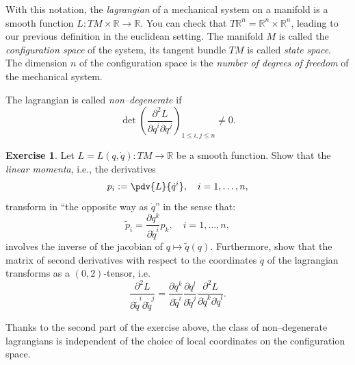 \documentclass[english,fontsize=11pt,paper=b5]{scrbook}
\theoremstyle{definition}
\newtheorem{exercise}{Exercise}[chapter]
\begin{document}
    With this notation, the \emph{lagrangian} of a mechanical system on a manifold is a smooth function $L : TM\times\mathbb{R} \to \mathbb{R}$.
    You can check that $T\mathbb{R}^n = \mathbb{R}^n \times \mathbb{R}^n$, leading to our previous definition in the euclidean setting.
    The manifold $M$ is called the \emph{configuration space} of the system, its tangent bundle $TM$ is called \emph{state space}. The dimension $n$ of the configuration space is the \emph{number of degrees of freedom} of the mechanical system.

    The lagrangian is called \emph{non--degenerate} if
    \begin{equation}
      \det %
      \left(\frac{\partial^2 L}{\partial \dot{q}^i \partial \dot{q}^j}\right)_{1\leq i,j\leq n}
      \neq 0.
    \end{equation}

    \begin{exercise}\label{exe:coordinatesInd}
      Let $L=L(q,\dot q):TM \to \mathbb{R}$ be a smooth function. Show that the \emph{linear momenta}, i.e., the derivatives
      \begin{equation}
        p_i := \pdv{L}{\dot q^i}, \quad i=1,\ldots,n,
      \end{equation}
      transform in ``the opposite way as $\dot q$'' in the sense that:
      \begin{equation}
        \widetilde p_i = \frac{\partial q^k}{\partial {\widetilde q}^i} p_k, \quad i=1,\ldots,n,
      \end{equation}
      involves the inverse of the jacobian of $q\mapsto \widetilde q(q)$.
      Furthermore, show that the matrix of second derivatives with respect to the coordinates $\dot q$ of the lagrangian transforms as a $(0,2)$-tensor, i.e.
      \begin{equation}
        \frac{\partial^2 L}{\partial \dot{\widetilde q}^i \partial \dot{\widetilde q}^j} =
        \frac{\partial q^k}{\partial {\widetilde q}^i}\frac{\partial q^l}{\partial {\widetilde q}^j}
        \frac{\partial^2 L}{\partial \dot{q}^k \partial \dot{q}^l}.
      \end{equation}
    \end{exercise}
    Thanks to the second part of the exercise above, the class of non--degenerate lagrangians is independent of the choice of local coordinates on the configuration space.
\end{document}
